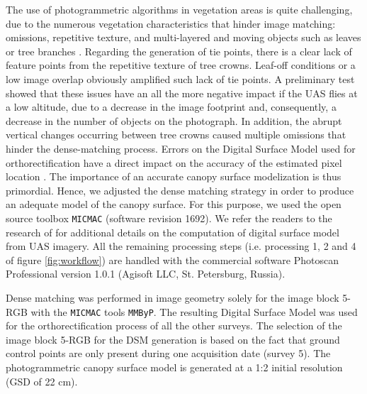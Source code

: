 \documentclass[remotesensing,article,submit,moreauthors,pdftex,12pt,a4paper]{mdpi} %
\begin{document}
The use of photogrammetric algorithms in vegetation areas is quite challenging, due to the numerous vegetation characteristics that hinder image matching: omissions, repetitive texture, and multi-layered and moving objects such as leaves or tree branches \cite{baltsavias_high-quality_2008}. 
Regarding the generation of tie points, there is a clear lack of feature points from the repetitive texture of tree crowns. 
Leaf-off conditions or a low image overlap obviously amplified such lack of tie points. 
A preliminary test showed that these issues have an all the more negative impact if the UAS flies at a low altitude, due to a decrease in the image footprint and, consequently, a decrease in the number of objects on the photograph. 
In addition, the abrupt vertical changes occurring between tree crowns caused multiple omissions that hinder the dense-matching process. 
Errors on the Digital Surface Model used for orthorectification have a direct impact on the accuracy of the estimated pixel location \cite{kempeneers_geometric_2013}. The importance of an accurate canopy surface modelization is thus primordial. 
Hence, we adjusted the dense matching strategy in order to produce an adequate model of the canopy surface. 
For this purpose, we used the open source toolbox {\tt MICMAC} \cite{pierrot-deseilligny_multiresolution_2006} (software revision 1692). 
We refer the readers to the research of \citeauthor{lisein_photogrammetric_2013} \cite{lisein_photogrammetric_2013} for additional details on the computation of digital surface model from UAS imagery. 
All the remaining processing steps (i.e. processing 1, 2 and 4 of figure \ref{fig:workflow}) are handled with the commercial software Photoscan Professional version 1.0.1 (Agisoft LLC, St. Petersburg, Russia). 

Dense matching was performed in image geometry solely for the image block 5-RGB with the {\tt MICMAC} tools {\tt MMByP}. The resulting Digital Surface Model was used for the orthorectification process of all the other surveys. 
The selection of the image block 5-RGB for the DSM generation is based on the fact that ground control points are only present during one acquisition date (survey 5). 
The photogrammetric canopy surface model is generated at a 1:2 initial resolution (GSD of 22 cm).
\end{document}
